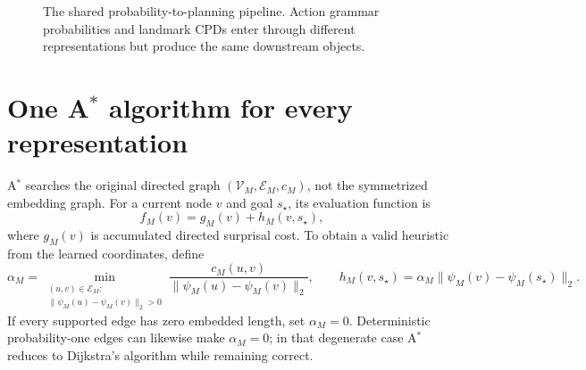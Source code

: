 \documentclass[11pt]{article}
\begin{document}
\begin{figure}[htbp]
\centering
{}
\caption{The shared probability-to-planning pipeline. Action grammar probabilities and
landmark CPDs enter through different representations but produce the same downstream
objects.}
\label{fig:pipeline}
\end{figure}

\section{One \texorpdfstring{A$^\ast$}{A-star} algorithm for every representation}
\label{sec:astar}

A$^\ast$ searches the original directed graph
$(\mathcal V_M,\mathcal E_M,c_M)$, not the symmetrized embedding graph. For a current node
$v$ and goal $s_\star$, its evaluation function is
\begin{equation}
f_M(v)=g_M(v)+h_M(v,s_\star),
\label{eq:astar-score}
\end{equation}
where $g_M(v)$ is accumulated directed surprisal cost. To obtain a valid heuristic from
the learned coordinates, define
\begin{equation}
\alpha_M
=
\min_{\substack{(u,v)\in\mathcal E_M:\\
\|\psi_M(u)-\psi_M(v)\|_2>0}}
\frac{c_M(u,v)}
{\|\psi_M(u)-\psi_M(v)\|_2},
\qquad
h_M(v,s_\star)
=
\alpha_M\|\psi_M(v)-\psi_M(s_\star)\|_2.
\label{eq:scaled-heuristic}
\end{equation}
If every supported edge has zero embedded length, set $\alpha_M=0$. Deterministic
probability-one edges can likewise make $\alpha_M=0$; in that degenerate case A$^\ast$
reduces to Dijkstra's algorithm while remaining correct.
\end{document}
